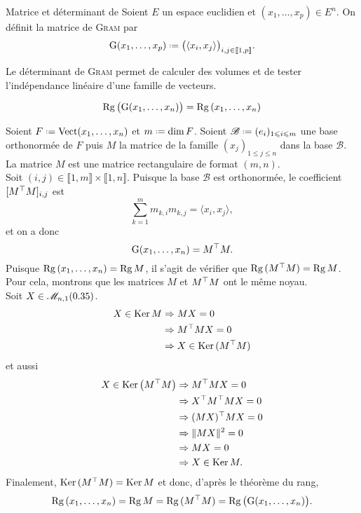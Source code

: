 \begin{defi}{Matrice et déterminant de }
    Soient $E$ un espace euclidien et $(x_1, \dots, x_p) \in E^n$. On définit la matrice de \textsc{Gram} par
    $$\Gram(x_1, \dots, x_p) \defeq \big( \langle x_i, x_j \rangle \big)_{i,j \in \llbracket 1, p \rrbracket}.$$
\end{defi}
Le déterminant de \textsc{Gram} permet de calculer des volumes et de tester l'indépendance linéaire d'une famille de vecteurs.
\begin{prop}{}
    $$\mathrm{Rg}\, \big( \mathrm{G}(x_1, \dots, x_n) \big) = \mathrm{Rg}\,(x_1, \dots, x_n)$$
\end{prop}

\begin{preuve}
    Soient $F \defeq \Vect(x_1, \dots, x_n)$ et $m \defeq \dim F$. Soient $\mathscr{B} \defeq (e_i)_{1 \leqslant i \leqslant m}$ une base orthonormée de $F$ puis $M$ la matrice de la famille $(x_j)_{1 \leqslant j \leqslant n}$ dans la base $\mathscr{B}$. La matrice $M$ est une matrice rectangulaire de format $(m, n)$. \\
    Soit $(i, j) \in \llbracket 1, m \rrbracket \times \llbracket 1, n \rrbracket$. Puisque la base $\mathscr{B}$ est orthonormée, le coefficient $[ M^\top M ]_{i,j}$ est 
    $$\sum_{k=1}^m m_{k,i} m_{k,j} = \langle x_i, x_j \rangle,$$
    et on a donc
    $$\mathrm{G}(x_1, \dots, x_n) = M^\top M.$$
    Puisque $\mathrm{Rg}\,(x_1, \dots, x_n) = \mathrm{Rg}\, M$, il s'agit de vérifier que $\mathrm{Rg}\,(M^\top M) = \mathrm{Rg}\, M$. Pour cela, montrons que les matrices $M$ et $M^\top M$ ont le même noyau. \\
    Soit $X \in \mathscr{M}_{n,1}(0.35)$.
    \begin{align*}
        X \in \mathrm{Ker}\, M &\Rightarrow MX = 0 \\
        &\Rightarrow M^\top MX = 0 \\
        &\Rightarrow X \in \mathrm{Ker}\,(M^\top M)
    \end{align*}
    et aussi
    \begin{align*}
        X \in \mathrm{Ker}\, \big( M^\top M \big) &\Rightarrow M^\top MX = 0 \\
        &\Rightarrow X^\top M^\top MX = 0 \\
        &\Rightarrow (MX)^\top MX = 0 \\
        &\Rightarrow \Vert MX \Vert^2 = 0 \\
        &\Rightarrow MX = 0 \\
        &\Rightarrow X \in \mathrm{Ker}\, M.
    \end{align*}
    Finalement, $\mathrm{Ker}\,(M^\top M) = \mathrm{Ker}\, M$ et donc, d'après le théorème du rang,
    $$\mathrm{Rg}\,(x_1, \dots, x_n) = \mathrm{Rg}\, M = \mathrm{Rg}\,(M^\top M) = \mathrm{Rg}\, \big( \mathrm{G}(x_1, \dots, x_n) \big).$$
\end{preuve}

